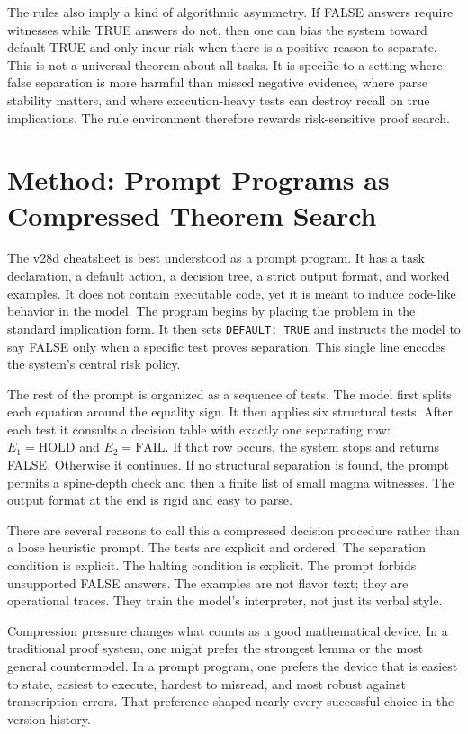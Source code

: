 \documentclass[12pt]{amsart}
\begin{document}
The rules also imply a kind of algorithmic asymmetry. If FALSE answers require witnesses while TRUE answers do not, then one can bias the system toward default TRUE and only incur risk when there is a positive reason to separate. This is not a universal theorem about all tasks. It is specific to a setting where false separation is more harmful than missed negative evidence, where parse stability matters, and where execution-heavy tests can destroy recall on true implications. The rule environment therefore rewards risk-sensitive proof search.

\section{Method: Prompt Programs as Compressed Theorem Search}

The v28d cheatsheet is best understood as a prompt program. It has a task declaration, a default action, a decision tree, a strict output format, and worked examples. It does not contain executable code, yet it is meant to induce code-like behavior in the model. The program begins by placing the problem in the standard implication form. It then sets \texttt{DEFAULT: TRUE} and instructs the model to say FALSE only when a specific test proves separation. This single line encodes the system's central risk policy.

The rest of the prompt is organized as a sequence of tests. The model first splits each equation around the equality sign. It then applies six structural tests. After each test it consults a decision table with exactly one separating row: $E_1 = \mathrm{HOLD}$ and $E_2 = \mathrm{FAIL}$. If that row occurs, the system stops and returns FALSE. Otherwise it continues. If no structural separation is found, the prompt permits a spine-depth check and then a finite list of small magma witnesses. The output format at the end is rigid and easy to parse.

There are several reasons to call this a compressed decision procedure rather than a loose heuristic prompt. The tests are explicit and ordered. The separation condition is explicit. The halting condition is explicit. The prompt forbids unsupported FALSE answers. The examples are not flavor text; they are operational traces. They train the model's interpreter, not just its verbal style.

Compression pressure changes what counts as a good mathematical device. In a traditional proof system, one might prefer the strongest lemma or the most general countermodel. In a prompt program, one prefers the device that is easiest to state, easiest to execute, hardest to misread, and most robust against transcription errors. That preference shaped nearly every successful choice in the version history.
\end{document}

